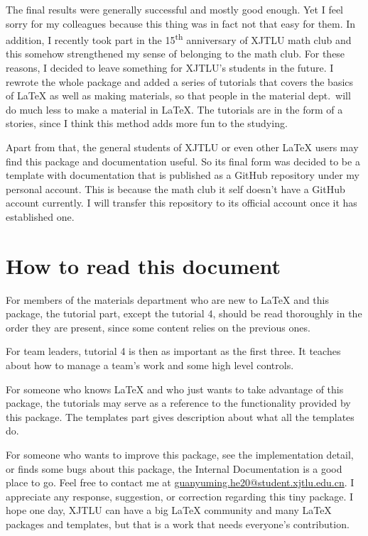 The final results were generally successful and mostly good enough. Yet I feel sorry for my colleagues because this thing was in fact not that easy for them. In addition, I recently took part in the 15\textsuperscript{th} anniversary of XJTLU math club and this somehow strengthened my sense of belonging to the math club. For these reasons, I decided to leave something for XJTLU's students in the future. I rewrote the whole package and added a series of tutorials that covers the basics of \LaTeX{} as well as making materials, so that people in the material dept.~will do much less to make a material in \LaTeX. The tutorials are in the form of a stories, since I think this method adds more fun to the studying.

Apart from that, the general students of XJTLU or even other \LaTeX{} users may find this package and documentation useful. So its final form was decided to be a template with documentation that is published as a GitHub repository under my personal account. This is because the math club it self doesn't have a GitHub account currently. I will transfer this repository to its official account once it has established one.

\section{How to read this document}
For members of the materials department who are new to \LaTeX{} and this package, the tutorial part, except the tutorial 4, should be read thoroughly in the order they are present, since some content relies on the previous ones.

For team leaders, tutorial 4 is then as important as the first three. It teaches about how to manage a team's work and some high level controls.

For someone who knows \LaTeX{} and who just wants to take advantage of this package, the tutorials may serve as a reference to the functionality provided by this package. The templates part gives description about what all the templates do.

For someone who wants to improve this package, see the implementation detail, or finds some bugs about this package, the Internal Documentation is a good place to go. Feel free to contact me at \url{guanyuming.he20@student.xjtlu.edu.cn}. I appreciate any response, suggestion, or correction regarding this tiny package. I hope one day, XJTLU can have a big \LaTeX{} community and many \LaTeX{} packages and templates, but that is a work that needs everyone's contribution.